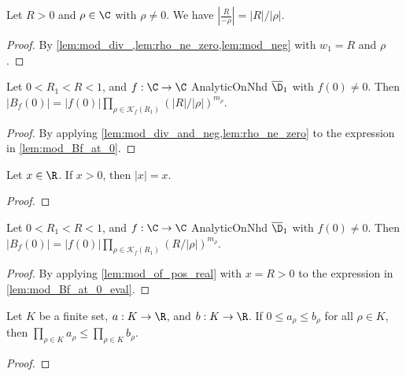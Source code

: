 \begin{lemma} \label{lem:mod_div_and_neg}  \leanok
Let $R>0$ and $\rho\in\C$ with $\rho \neq 0$. We have $|\frac{R}{-\rho}| = |R|/|\rho|$.
\end{lemma}
\begin{proof} \leanok
{}
By \cref{lem:mod_div_,lem:rho_ne_zero,lem:mod_neg} with $w_1=R$ and $\rho$.
\end{proof}


\begin{lemma}\label{lem:mod_Bf_at_0_eval}  \leanok
Let $0<R_1<R<1$, and $f:\C\to\C$ AnalyticOnNhd $\overline{\D}_1$ with $f(0)\neq0$. Then $|B_f(0)|=|f(0)|\prod_{\rho\in\mathcal K_f(R_1)}(|R|/|\rho|)^{m_\rho}$.
\end{lemma}
\begin{proof} \leanok
{}
By applying \cref{lem:mod_div_and_neg,lem:rho_ne_zero} to the expression in \cref{lem:mod_Bf_at_0}.
\end{proof}

\begin{lemma}\label{lem:mod_of_pos_real} \leanok
Let $x \in \R$. If $x>0$, then $|x|=x$.
\end{lemma}
\begin{proof} \leanok
\end{proof}


\begin{lemma}\label{lem:mod_Bf_at_0_as_ratio}  \leanok
Let $0<R_1<R<1$, and $f:\C\to\C$ AnalyticOnNhd $\overline{\D}_1$ with $f(0)\neq0$. Then $|B_f(0)|=|f(0)|\prod_{\rho\in\mathcal K_f(R_1)}(R/|\rho|)^{m_\rho}$.
\end{lemma}
\begin{proof} \leanok
{}
By applying \cref{lem:mod_of_pos_real} with $x=R>0$ to the expression in \cref{lem:mod_Bf_at_0_eval}.
\end{proof}


\begin{lemma}\label{lem:prod_ineq}  \leanok
Let $K$ be a finite set, $a:K\to\R$, and $b:K\to\R$. If $0\le a_\rho \le b_\rho$ for all $\rho\in K$, then $\prod_{\rho\in K} a_\rho \le \prod_{\rho\in K} b_\rho$.
\end{lemma}
\begin{proof} \leanok
\end{proof}

